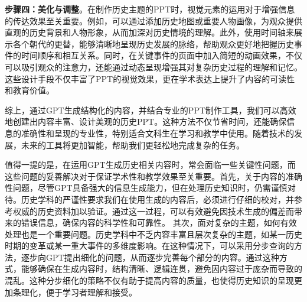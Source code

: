 
\textbf{步骤四：美化与调整}。在制作历史主题的PPT时，视觉元素的运用对于增强信息的传达效果至关重要。例如，可以通过添加历史地图或重要人物画像，为观众提供直观的历史背景和人物形象，从而加深对历史情境的理解。此外，使用时间轴来展示各个朝代的更替，能够清晰地呈现历史发展的脉络，帮助观众更好地把握历史事件的时间顺序和相互关系。同时，在关键事件的页面中加入简短的动画效果，不仅可以吸引观众的注意力，还能通过动态呈现增强其对复杂历史过程的理解和记忆。这些设计手段不仅丰富了PPT的视觉效果，更在学术表达上提升了内容的可读性和教育价值。

综上，通过GPT生成结构化的内容，并结合专业的PPT制作工具，我们可以高效地创建出内容丰富、设计美观的历史PPT。这种方法不仅节省时间，还能确保信息的准确性和呈现的专业性，特别适合文科生在学习和教学中使用。随着技术的发展，未来的工具将更加智能，帮助我们更轻松地完成复杂的任务。

值得一提的是，在运用GPT生成历史相关内容时，常会面临一些关键性问题，而这些问题的妥善解决对于保证学术性和教学效果至关重要。首先，关于内容的准确性问题，尽管GPT具备强大的信息生成能力，但在处理历史知识时，仍需谨慎对待。历史学科的严谨性要求我们在使用生成的内容后，必须进行仔细的校对，并参考权威的历史资料加以验证。通过这一过程，可以有效避免因技术生成的偏差而带来的错误信息，确保内容的科学性和可靠性。
其次，面对复杂的主题，如何有效处理也是一个重要问题。历史学科中不乏内容丰富且层次复杂的主题，如某一历史时期的变革或某一重大事件的多维度影响。在这种情况下，可以采用分步查询的方法，逐步向GPT提出细化的问题，从而逐步完善每个部分的内容。通过这种方式，能够确保在生成内容时，结构清晰、逻辑连贯，避免因内容过于庞杂而导致的混乱。这种分步细化的策略不仅有助于提高内容的质量，也使得历史知识的呈现更加条理化，便于学习者理解和接受。
